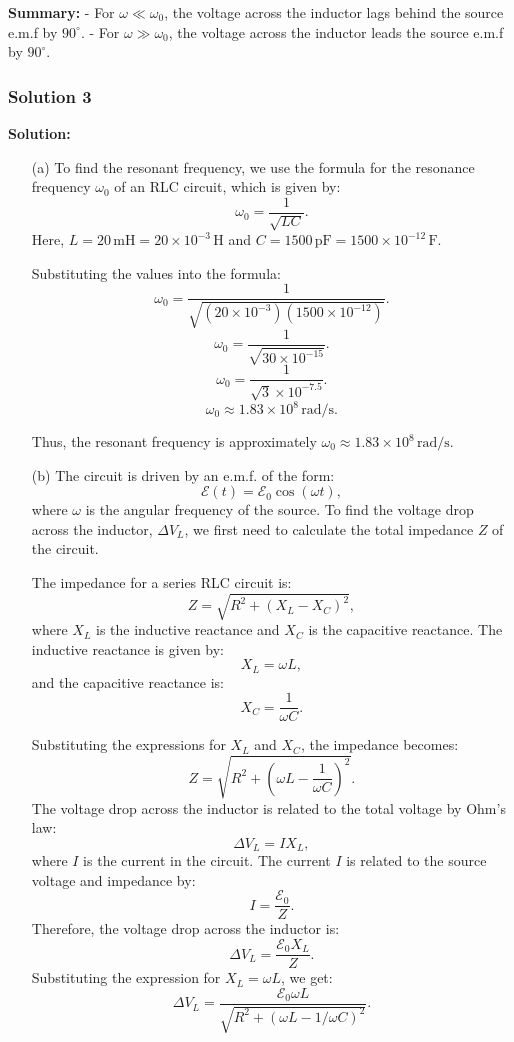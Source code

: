 \documentclass{article}
\begin{document}
\textbf{Summary:}
- For $\omega \ll \omega_0$, the voltage across the inductor lags behind the source e.m.f by $90^\circ$.
- For $\omega \gg \omega_0$, the voltage across the inductor leads the source e.m.f by $90^\circ$.

\subsubsection{Solution 3}
\textbf{Solution:}

\begin{enumerate}
    \item[(a)] To find the resonant frequency, we use the formula for the resonance frequency $\omega_0$ of an RLC circuit, which is given by:
    \[
    \omega_0 = \frac{1}{\sqrt{LC}}.
    \]
    Here, $L = 20\,\mathrm{mH} = 20 \times 10^{-3}\,\mathrm{H}$ and $C = 1500\,\mathrm{pF} = 1500 \times 10^{-12}\,\mathrm{F}$.

    Substituting the values into the formula:
    \[
    \omega_0 = \frac{1}{\sqrt{(20 \times 10^{-3})(1500 \times 10^{-12})}}.
    \]
    \[
    \omega_0 = \frac{1}{\sqrt{30 \times 10^{-15}}}.
    \]
    \[
    \omega_0 = \frac{1}{\sqrt{3} \times 10^{-7.5}}.
    \]
    \[
    \omega_0 \approx 1.83 \times 10^8 \, \mathrm{rad/s}.
    \]
    
    Thus, the resonant frequency is approximately $\omega_0 \approx 1.83 \times 10^8 \, \mathrm{rad/s}$.

    \item[(b)] The circuit is driven by an e.m.f. of the form:
    \[
    \mathcal{E}(t) = \mathcal{E}_0 \cos(\omega t),
    \]
    where $\omega$ is the angular frequency of the source. To find the voltage drop across the inductor, $\Delta V_L$, we first need to calculate the total impedance $Z$ of the circuit.

    The impedance for a series RLC circuit is:
    \[
    Z = \sqrt{R^2 + (X_L - X_C)^2},
    \]
    where $X_L$ is the inductive reactance and $X_C$ is the capacitive reactance. The inductive reactance is given by:
    \[
    X_L = \omega L,
    \]
    and the capacitive reactance is:
    \[
    X_C = \frac{1}{\omega C}.
    \]

    Substituting the expressions for $X_L$ and $X_C$, the impedance becomes:
    \[
    Z = \sqrt{R^2 + \left( \omega L - \frac{1}{\omega C} \right)^2}.
    \]
    The voltage drop across the inductor is related to the total voltage by Ohm’s law:
    \[
    \Delta V_L = I X_L,
    \]
    where $I$ is the current in the circuit. The current $I$ is related to the source voltage and impedance by:
    \[
    I = \frac{\mathcal{E}_0}{Z}.
    \]
    Therefore, the voltage drop across the inductor is:
    \[
    \Delta V_L = \frac{\mathcal{E}_0 X_L}{Z}.
    \]
    Substituting the expression for $X_L = \omega L$, we get:
    \[
    \Delta V_L = \frac{\mathcal{E}_0 \omega L}{\sqrt{R^2 + (\omega L - 1/\omega C)^2}}.
    \]


\end{enumerate}
\end{document}
